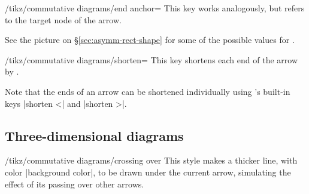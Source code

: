 \documentclass[a4paper]{ltxdoc}
\begin{document}
\begin{key}{/tikz/commutative diagrams/end anchor=}
  This key works analogously, but refers to the target node of the arrow.
\end{key}

See the picture on \S\ref{sec:asymm-rect-shape} for some of the
possible values for .
\begin{codeexample}[]
\end{codeexample}

\begin{key}{/tikz/commutative diagrams/shorten=}
  This key shortens each end of the arrow by .

\begin{codeexample}[]
\end{codeexample}
\end{key}

Note that the ends of an arrow can be shortened individually using
\tikzname's built-in keys |shorten <| and |shorten >|.

\subsection{Three-dimensional diagrams}
\label{sec:crossing-over}

\begin{stylekey}{/tikz/commutative diagrams/crossing over}
  This style makes a thicker line, with color |background color|, to
  be drawn under the current arrow, simulating the effect of its
  passing over other arrows.

\begin{codeexample}[]
\end{codeexample}
\end{stylekey}
\end{document}
